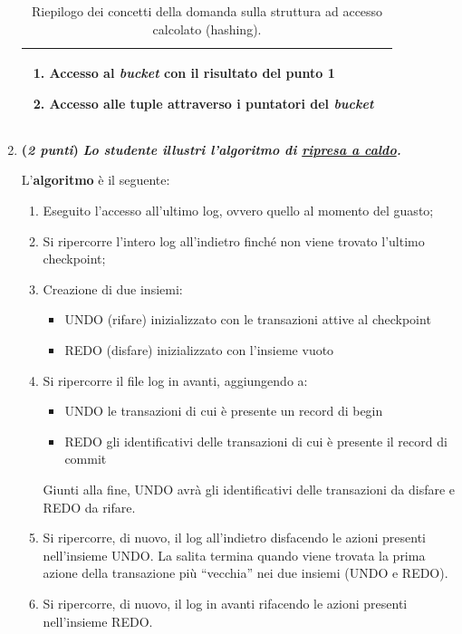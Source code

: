 \documentclass[a4paper]{article}
\newcommand{\dquotes}[1]{``#1''}
\begin{document}
\begin{enumerate}
\begin{table}[!htp]
\begin{tabular}{@{} l p{27em} @{}}
\begin{enumerate}
					\item \textbf{Accesso al \emph{bucket}} con il risultato del punto 1
					
					\item \textbf{Accesso alle tuple} attraverso i puntatori del \emph{bucket}
				\end{enumerate} \\
				\bottomrule
			\end{tabular}
			\caption{Riepilogo dei concetti della domanda sulla struttura ad accesso calcolato (hashing).}
		\end{table}\newpage
		
		\item \textbf{(\emph{2 punti})} \textcolor{Green4}{\textbf{\emph{Lo studente illustri l'algoritmo di \underline{ripresa a caldo}.}}}\label{dom: ripresa a caldo}
		
		L'\textbf{algoritmo} è il seguente:
		\begin{enumerate}
			\item Eseguito l'accesso all'ultimo log, ovvero quello al momento del guasto;
			
			\item Si ripercorre l'intero log all'indietro finché non viene trovato l'ultimo checkpoint;
			
			\item Creazione di due insiemi:
			\begin{itemize}
				\item UNDO (rifare) inizializzato con le transazioni attive al checkpoint
				
				\item REDO (disfare) inizializzato con l'insieme vuoto
			\end{itemize}
			
			\item Si ripercorre il file log in avanti, aggiungendo a:
			\begin{itemize}
				\item UNDO le transazioni di cui è presente un record di \textsf{begin}
				
				\item REDO gli identificativi delle transazioni di cui è presente il record di \textsf{commit}
			\end{itemize}
			Giunti alla fine, UNDO avrà gli identificativi delle transazioni da disfare e REDO da rifare.
			
			\item Si ripercorre, di nuovo, il log all'indietro disfacendo le azioni presenti nell'insieme UNDO. La salita termina quando viene trovata la prima azione della transazione più \dquotes{vecchia} nei due insiemi (UNDO e REDO).
			
			\item Si ripercorre, di nuovo, il log in avanti rifacendo le azioni presenti nell'insieme REDO.
		\end{enumerate}
	\end{enumerate}\newpage
	
\end{document}
